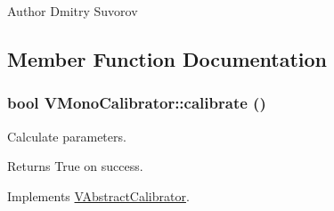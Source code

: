 \begin{DoxyAuthor}{Author}
Dmitry Suvorov 
\end{DoxyAuthor}


\subsection{Member Function Documentation}
\hypertarget{classVMonoCalibrator_a16cdc1f9c47d6437a124bd5f5a4ec426}{
\subsubsection[{calibrate}]{\setlength{\rightskip}{0pt plus 5cm}bool VMonoCalibrator::calibrate ()}}
\label{classVMonoCalibrator_a16cdc1f9c47d6437a124bd5f5a4ec426}
Calculate parameters. \begin{DoxyReturn}{Returns}
True on success. 
\end{DoxyReturn}


Implements \hyperlink{classVAbstractCalibrator_a7251a0da257534695adcec223d467835}{VAbstractCalibrator}.

